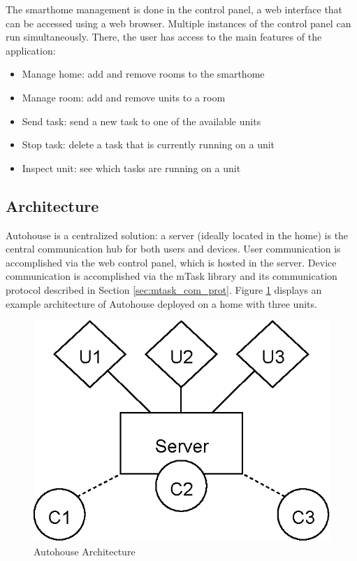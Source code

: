 The smarthome management is done in the control panel, a web interface that can be accessed using a web browser. Multiple instances of the control panel can run simultaneously. There, the user has access to the main features of the application:

\begin{itemize}
    \item Manage home: add and remove rooms to the smarthome
    \item Manage room: add and remove units to a room
    \item Send task: send a new task to one of the available units
    \item Stop task: delete a task that is currently running on a unit
    \item Inspect unit: see which tasks are running on a unit
\end{itemize}

\subsection{Architecture}

Autohouse is a centralized solution: a server (ideally located in the home) is the central communication hub for both users and devices. User communication is accomplished via the web control panel, which is hosted in the server. Device communication is accomplished via the mTask library and its communication protocol described in Section \ref{sec:mtask_com_prot}. Figure \ref{fig:autohouse_arch} displays an example architecture of Autohouse deployed on a home with three units. 

\begin{figure}[H]
\begin{center}
\includegraphics[scale=1.0]{thesis/img/autohouse_arch.eps}
\end{center}
\caption{Autohouse Architecture}
\label{fig:autohouse_arch}
\end{figure}

